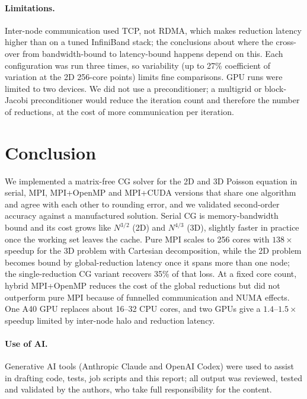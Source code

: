 \documentclass[11pt,a4paper]{article}
\begin{document}
\paragraph{Limitations.} Inter-node communication used TCP, not RDMA, which makes reduction
latency higher than on a tuned InfiniBand stack; the conclusions about where the cross-over from
bandwidth-bound to latency-bound happens depend on this. Each configuration was run three
times, so variability (up to 27\% coefficient of variation at the 2D 256-core points) limits fine
comparisons. GPU runs were limited to two devices. We did not use a preconditioner; a multigrid
or block-Jacobi preconditioner would reduce the iteration count and therefore the number of
reductions, at the cost of more communication per iteration.

\section{Conclusion}\label{sec:conclusion}
We implemented a matrix-free CG solver for the 2D and 3D Poisson equation in serial, MPI,
MPI+OpenMP and MPI+CUDA versions that share one algorithm and agree with each other to rounding
error, and we validated second-order accuracy against a manufactured solution. Serial CG is
memory-bandwidth bound and its cost grows like $N^{3/2}$ (2D) and $N^{4/3}$ (3D), slightly faster
in practice once the working set leaves the cache. Pure MPI scales to 256 cores with $138\times$
speedup for the 3D problem with Cartesian decomposition, while the 2D problem becomes bound by
global-reduction latency once it spans more than one node; the single-reduction CG variant
recovers 35\% of that loss. At a fixed core count, hybrid MPI+OpenMP reduces the cost of the
global reductions but did not outperform pure MPI because of funnelled communication and NUMA
effects. One A40 GPU replaces about 16--32 CPU cores, and two GPUs give a $1.4$--$1.5\times$ speedup
limited by inter-node halo and reduction latency.

\paragraph{Use of AI.} Generative AI tools (Anthropic Claude and OpenAI Codex) were used to assist
in drafting code, tests, job scripts and this report; all output was reviewed, tested and
validated by the authors, who take full responsibility for the content.
\end{document}
